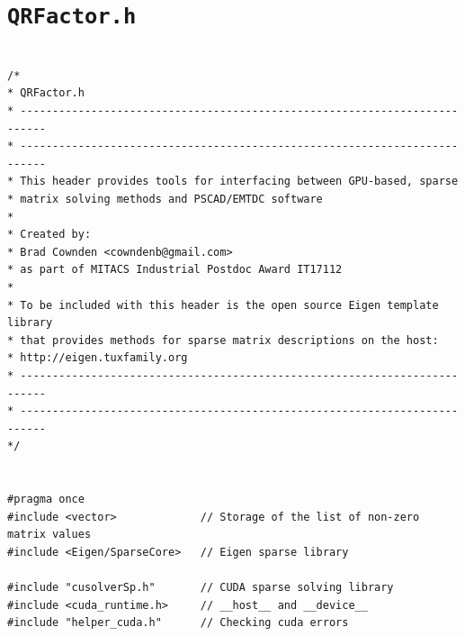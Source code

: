 \documentclass[11pt,letterpaper]{article}
\begin{document}
\section{\texttt{QRFactor.h}}
\label{sec: header file}
\begin{verbatim}

/*
* QRFactor.h
* --------------------------------------------------------------------------
* --------------------------------------------------------------------------
* This header provides tools for interfacing between GPU-based, sparse
* matrix solving methods and PSCAD/EMTDC software
* 
* Created by:
* Brad Cownden <cowndenb@gmail.com> 
* as part of MITACS Industrial Postdoc Award IT17112
* 
* To be included with this header is the open source Eigen template library 
* that provides methods for sparse matrix descriptions on the host:
* http://eigen.tuxfamily.org
* --------------------------------------------------------------------------
* --------------------------------------------------------------------------
*/


#pragma once
#include <vector>			  // Storage of the list of non-zero matrix values
#include <Eigen/SparseCore>	  // Eigen sparse library

#include "cusolverSp.h"		  // CUDA sparse solving library
#include <cuda_runtime.h>	  // __host__ and __device__
#include "helper_cuda.h"	  // Checking cuda errors


\end{verbatim}
\end{document}
